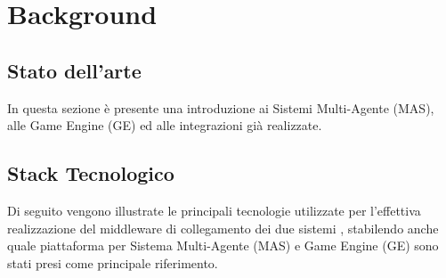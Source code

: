 \chapter{Background}

\section{Stato dell'arte}

In questa sezione è presente una introduzione ai Sistemi Multi-Agente (MAS), alle Game Engine (GE) ed alle integrazioni già realizzate.









\section{Stack Tecnologico}

Di seguito vengono illustrate le principali tecnologie utilizzate per l'effettiva realizzazione del middleware di collegamento dei due sistemi , stabilendo anche quale piattaforma per Sistema Multi-Agente (MAS) e Game Engine (GE) sono stati presi come principale riferimento.








